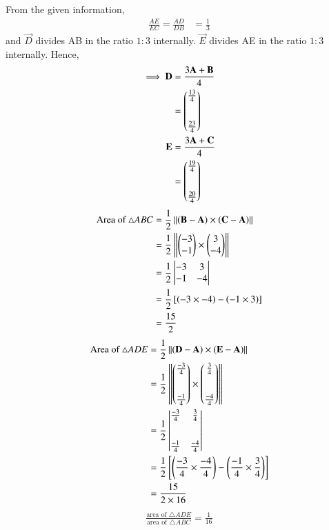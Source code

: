From the given information, 
\begin{align}
    \frac{AE}{EC} =  \frac{AD}{DB}&=\frac{1}{3}
\end{align}
and $\vec{D}$ divides AB in the ratio $1:3$ internally. $\vec{E}$ divides AE in the ratio $1:3$ internally.  Hence, 
\begin{align}
    \implies \mathbf{D} &=\frac{3\mathbf{A}+\mathbf{B}}{4}\\
    &=\begin{pmatrix}\frac{13}{4}\\[2em]\frac{23}{4}\end{pmatrix}\\
    \mathbf{E} &=\frac{3\mathbf{A}+\mathbf{C}}{4}\\
    &=\begin{pmatrix}\frac{19}{4}\\[2em]\frac{20}{4}\end{pmatrix}
\end{align}
\begin{align}
    \text{Area of } \triangle ABC &= \frac{1}{2}\left\lVert\left(\mathbf{B-A}\right) \times \left(\mathbf{C-A}\right)\right\rVert\\
    &=\frac{1}{2}\left\lVert\begin{pmatrix}-3\\-1\end{pmatrix}\times \begin{pmatrix}3\\-4\end{pmatrix}\right\rVert\\
        &=\frac{1}{2}\begin{vmatrix}
    -3&3\\
    -1&-4
    \end{vmatrix}\\
    &=\frac{1}{2}{}\left[\left(-3\times -4\right)-\left(-1 \times 3\right)\right]\\
    &=\frac{15}{2}
\end{align}
\begin{align}
    \text{Area of } \triangle ADE &= \frac{1}{2}\left\lVert\left(\mathbf{D-A}\right) \times \left(\mathbf{E-A}\right)\right\rVert\\
    &=\frac{1}{2}\left\lVert\begin{pmatrix}\frac{-3}{4}\\[2em]\frac{-1}{4}\end{pmatrix}\times \begin{pmatrix}\frac{3}{4}\\[2em]\frac{-4}{4}\end{pmatrix}\right\rVert\\
    &=\frac{1}{2}\begin{vmatrix}
    \frac{-3}{4}&\frac{3}{4}\\[2em]
    \frac{-1}{4}&\frac{-4}{4}
    \end{vmatrix}\\
    &=\frac{1}{2}{}\left[\left(\frac{-3}{4}\times \frac{-4}{4}\right)-\left(\frac{-1}{4} \times \frac{3}{4}\right)\right]\\
    &=\frac{15}{2\times16}
\end{align}
\begin{align}
    \frac{\text{area of } \triangle ADE}{\text{area of } \triangle ABC}=\frac{1}{16}
\end{align}
